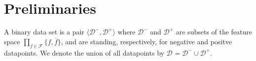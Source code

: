 \documentclass{llncs}
\def\posclass{+}
\def\negclass{-}
\def\datasymb{D}
\newcommand{\setex}[1]{\ensuremath{{\mathcal \datasymb}^{#1}}\xspace}
\newcommand{\posex}{{\setex{\posclass}}\xspace}
\newcommand{\negex}{{\setex{\negclass}}\xspace}
\newcommand{\allex}{{\setex{}}\xspace}
\newcommand{\features}{\ensuremath{{\mathcal F}}\xspace}
\newcommand{\var}{\ensuremath{x}}
\newcommand{\ex}{\ensuremath{\var}}
\newcommand{\afeat}[0]{\ensuremath{f}}
\newcommand{\aclass}[0]{\ensuremath{l}}
\newcommand{\classlabel}[1][]{\ensuremath{\ifthenelse{\equal{#1}{}}{{y}}{{y({{#1}})}}}}
\begin{document}
%
%
%
%
%
%
%

\section{Preliminaries}

A binary data set is a pair $\langle \negex,\posex \rangle$ where $\negex$ and $\posex$ are subsets of the feature space $\prod_{\afeat \in \features}\{\afeat,\bar{\afeat}\}$, and are standing, respectively, for negative and positve datapoints.
We denote the union of all datapoints by $\allex = \negex \cup \posex$.
\end{document}
